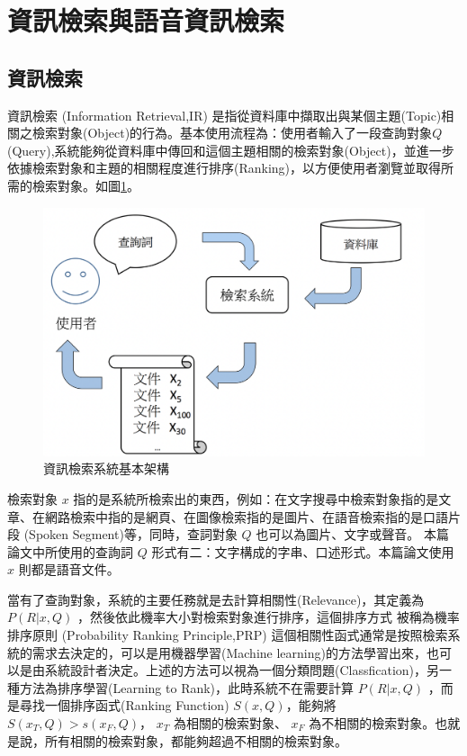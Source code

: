 \section{資訊檢索與語音資訊檢索}

\subsection{資訊檢索}


資訊檢索 (Information Retrieval,IR)
是指從資料庫中擷取出與某個主題(Topic)相關之檢索對象(Object)的行為。基本使用流程為：使用者輸入了一段查詢對象$Q$(Query),系統能夠從資料庫中傳回和這個主題相關的檢索對象(Object)，並進一步依據檢索對象和主題的相關程度進行排序(Ranking)，以方便使用者瀏覽並取得所需的檢索對象。如圖\ref{fig:ch2_IR}。
\begin{figure}
\centering
\includegraphics[scale=0.4]{images/ch2_Ir.png}
\caption{資訊檢索系統基本架構} \label{fig:ch2_IR}
\end{figure}

檢索對象 $x$ 指的是系統所檢索出的東西，例如：在文字搜尋中檢索對象指的是文章、在網路檢索中指的是網頁、在圖像檢索指的是圖片、在語音檢索指的是口語片段 (Spoken Segment)等，同時，查詞對象 $Q$ 也可以為圖片、文字或聲音。
本篇論文中所使用的查詢詞 $Q$ 形式有二：文字構成的字串、口述形式。本篇論文使用 $x$ 則都是語音文件。

當有了查詢對象，系統的主要任務就是去計算相關性(Relevance)，其定義為 $P(R|x,Q)$ ，然後依此機率大小對檢索對象進行排序，這個排序方式
被稱為機率排序原則 (Probability Ranking Principle,PRP)\cite{robertson1997probability}
這個相關性函式通常是按照檢索系統的需求去決定的，可以是用機器學習(Machine
learning)的方法學習出來，也可以是由系統設計者決定。上述的方法可以視為一個分類問題(Classfication)，另一種方法為排序學習(Learning
to Rank)，此時系統不在需要計算 $P(R|x,Q)$ ，而是尋找一個排序函式(Ranking Function)
$S(x,Q)$，能夠將$ S(x_T,Q)>s(x_F,Q)$， $x_T$ 為相關的檢索對象、 $x_F$
為不相關的檢索對象。也就是說，所有相關的檢索對象，都能夠超過不相關的檢索對象。

